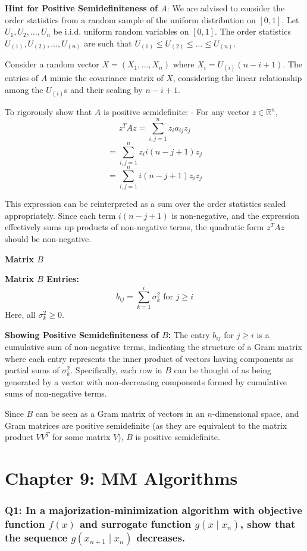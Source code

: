 \documentclass[8pt]{article}
\begin{document}
{\textbf{Hint for Positive Semidefiniteness of \(A\)}:
We are advised to consider the order statistics from a random sample of the uniform distribution on \([0, 1]\). Let \(U_1, U_2, \ldots, U_n\) be i.i.d. uniform random variables on \([0, 1]\). The order statistics \(U_{(1)}, U_{(2)}, \ldots, U_{(n)}\) are such that \(U_{(1)} \leq U_{(2)} \leq \ldots \leq U_{(n)}\).

Consider a random vector \(X = (X_1, \ldots, X_n)\) where \(X_i = U_{(i)}(n - i + 1)\). The entries of \(A\) mimic the covariance matrix of \(X\), considering the linear relationship among the \(U_{(i)}\)s and their scaling by \(n - i + 1\).

To rigorously show that \(A\) is positive semidefinite:
- For any vector \(z \in \mathbb{R}^n\),
\[ z^T A z = \sum_{i,j=1}^n z_i a_{ij} z_j \]
\[ = \sum_{i,j=1}^n z_i i(n - j + 1) z_j \]
\[ = \sum_{i,j=1}^n i(n - j + 1) z_i z_j \]

This expression can be reinterpreted as a sum over the order statistics scaled appropriately. Since each term \(i(n - j + 1)\) is non-negative, and the expression effectively sums up products of non-negative terms, the quadratic form \(z^T A z\) should be non-negative.

\textbf{Matrix \(B\)}

\textbf{ Matrix \(B\) Entries:}
\[ b_{ij} = \sum_{k=1}^i \sigma_k^2 \text{ for } j \geq i \]
Here, all \(\sigma_k^2 \geq 0\).

\textbf{Showing Positive Semidefiniteness of \(B\):}
The entry \(b_{ij}\) for \(j \geq i\) is a cumulative sum of non-negative terms, indicating the structure of a Gram matrix where each entry represents the inner product of vectors having components as partial sums of \(\sigma_k^2\). Specifically, each row in \(B\) can be thought of as being generated by a vector with non-decreasing components formed by cumulative sums of non-negative terms.

Since \(B\) can be seen as a Gram matrix of vectors in an \(n\)-dimensional space, and Gram matrices are positive semidefinite (as they are equivalent to the matrix product \(VV^T\) for some matrix \(V\)), \(B\) is positive semidefinite.

\newpage
\section*{Chapter 9: MM Algorithms}
\subsubsection*{Q1: In a majorization-minimization algorithm with objective function \(f(x)\) and surrogate function \(g(x \mid x_n)\), show that the sequence \(g(x_{n+1} \mid x_n)\) decreases.}

}
\end{document}
